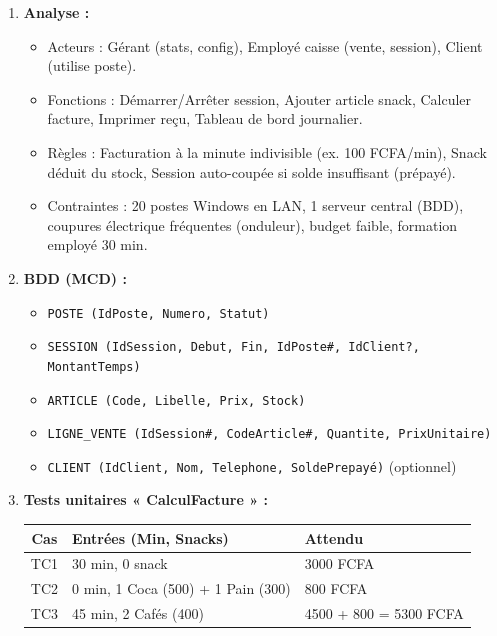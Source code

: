 \documentclass[11pt]{article}
\begin{document}
\begin{corrige}
\begin{enumerate}
    \item \textbf{Analyse :}
        \begin{itemize}
            \item Acteurs : Gérant (stats, config), Employé caisse (vente, session), Client (utilise poste).
            \item Fonctions : Démarrer/Arrêter session, Ajouter article snack, Calculer facture, Imprimer reçu, Tableau de bord journalier.
            \item Règles : Facturation à la minute indivisible (ex. 100 FCFA/min), Snack déduit du stock, Session auto-coupée si solde insuffisant (prépayé).
            \item Contraintes : 20 postes Windows en LAN, 1 serveur central (BDD), coupures électrique fréquentes (onduleur), budget faible, formation employé 30 min.
        \end{itemize}
    \item \textbf{BDD (MCD) :}
        \begin{itemize}
            \item \texttt{POSTE (IdPoste, Numero, Statut)}
            \item \texttt{SESSION (IdSession, Debut, Fin, IdPoste\#, IdClient?, MontantTemps)}
            \item \texttt{ARTICLE (Code, Libelle, Prix, Stock)}
            \item \texttt{LIGNE\_VENTE (IdSession\#, CodeArticle\#, Quantite, PrixUnitaire)}
            \item \texttt{CLIENT (IdClient, Nom, Telephone, SoldePrepayé)} (optionnel)
        \end{itemize}
    \item \textbf{Tests unitaires « CalculFacture » :}
        \begin{center}
        \begin{tabularx}{\linewidth}{|c|X|X|}\hline
        \rowcolor{popblue}\textbf{Cas} & \textbf{Entrées (Min, Snacks)} & \textbf{Attendu} \\\hline
        TC1 & 30 min, 0 snack & 3000 FCFA \\\hline
        TC2 & 0 min, 1 Coca (500) + 1 Pain (300) & 800 FCFA \\\hline
        TC3 & 45 min, 2 Cafés (400) & 4500 + 800 = 5300 FCFA \\\hline

\end{tabularx}
\end{center}
\end{enumerate}
\end{corrige}
\end{document}
